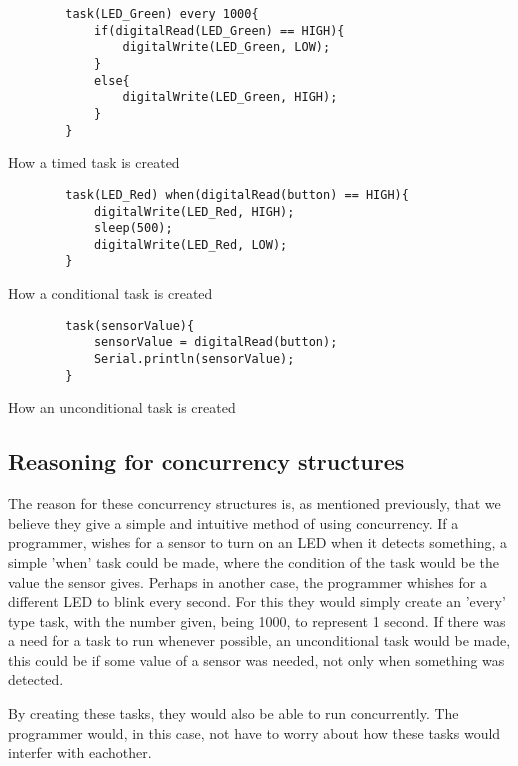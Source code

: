 \begin{listing}
    \begin{verbatim}
        task(LED_Green) every 1000{
            if(digitalRead(LED_Green) == HIGH){
                digitalWrite(LED_Green, LOW);
            }
            else{
                digitalWrite(LED_Green, HIGH);
            }
        }
    \end{verbatim}
    \caption{How a timed task is created}
    \label{List: Timed task example}
\end{listing}

\begin{listing}
    \begin{verbatim}
        task(LED_Red) when(digitalRead(button) == HIGH){
            digitalWrite(LED_Red, HIGH);
            sleep(500);
            digitalWrite(LED_Red, LOW); 
        }
    \end{verbatim}
    \caption{How a conditional task is created}
    \label{List: conditional task example}
\end{listing}

\begin{listing}
    \begin{verbatim}
        task(sensorValue){
            sensorValue = digitalRead(button);
            Serial.println(sensorValue);
        }
    \end{verbatim}
    \caption{How an unconditional task is created}
    \label{List: unconditional task example}
\end{listing}


\subsection{Reasoning for concurrency structures}
The reason for these concurrency structures is, as mentioned previously, that we believe they give a simple and intuitive method of using concurrency. If a programmer, wishes for a sensor to turn on an LED when it detects something, a simple 'when' task could be made, where the condition of the task would be the value the sensor gives. Perhaps in another case, the programmer whishes for a different LED to blink every second. For this they would simply create an 'every' type task, with the number given, being 1000, to represent 1 second. If there was a need for a task to run whenever possible, an unconditional task would be made, this could be if some value of a sensor was needed, not only when something was detected.

By creating these tasks, they would also be able to run concurrently. The programmer would, in this case, not have to worry about how these tasks would interfer with eachother.

